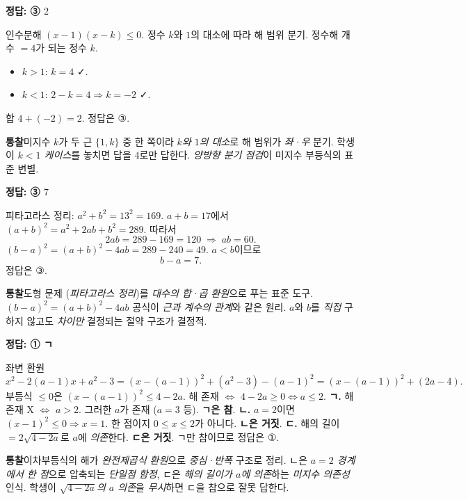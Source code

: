 \documentclass[10pt]{article}
\newcommand{\solnote}[1]{\par\smallskip\noindent
  \begin{tcolorbox}[enhanced, breakable, colback=vB-light, colframe=vB-light,
    boxrule=0pt, arc=3pt, left=10pt, right=10pt, top=4pt, bottom=4pt,
    fontupper=\sffamily\footnotesize\color{vB-ink}]
    \textbf{\color{vB-deep}통찰}\quad #1
  \end{tcolorbox}}
\begin{document}
\begin{answerbox}\sffamily\bfseries 정답: ③ $2$\end{answerbox}
 인수분해 $(x - 1)(x - k) \le 0$.
 정수 $k$와 $1$의 대소에 따라 해 범위 분기.
 정수해 개수 $= 4$가 되는 정수 $k$.
\begin{itemize}\setlength{\itemsep}{0pt}
\item $k > 1$: $k = 4$ ✓.
\item $k < 1$: $2 - k = 4 \Rightarrow k = -2$ ✓.
\end{itemize}
 합 $4 + (-2) = 2$.
정답은 $\textbf{③}$.
\solnote{미지수 $k$가 두 근 $\{1, k\}$ 중 한 쪽이라 \emph{$k$와 $1$의 대소}로 해 범위가 \emph{좌·우} 분기. 학생이 \emph{$k < 1$ 케이스}를 놓치면 답을 $4$로만 답한다. \emph{양방향 분기 점검}이 미지수 부등식의 표준 변별.}

\begin{answerbox}\sffamily\bfseries 정답: ③ $7$\end{answerbox}
 피타고라스 정리: $a^2 + b^2 = 13^2 = 169$.
 $a + b = 17$에서 $(a + b)^2 = a^2 + 2ab + b^2 = 289$. 따라서
\[ 2ab = 289 - 169 = 120 \;\Longrightarrow\; ab = 60. \]
 $(b - a)^2 = (a + b)^2 - 4ab = 289 - 240 = 49$. $a < b$이므로
\[ b - a = 7. \]
정답은 $\textbf{③}$.
\solnote{도형 문제 (\emph{피타고라스 정리})를 \emph{대수의 합·곱 환원}으로 푸는 표준 도구. $(b - a)^2 = (a+b)^2 - 4ab$ 공식이 \emph{근과 계수의 관계}와 같은 원리. $a$와 $b$를 \emph{직접} 구하지 않고도 \emph{차이만} 결정되는 절약 구조가 결정적.}

\begin{answerbox}\sffamily\bfseries 정답: ① ㄱ\end{answerbox}
 좌변 환원
\[ x^2 - 2(a - 1)x + a^2 - 3 = (x - (a - 1))^2 + (a^2 - 3) - (a - 1)^2 = (x - (a - 1))^2 + (2a - 4). \]
부등식 $\le 0$은 $(x - (a-1))^2 \le 4 - 2a$. 해 존재 $\Leftrightarrow$ $4 - 2a \ge 0 \Leftrightarrow a \le 2$.
 \textbf{ㄱ.} 해 존재 X $\Leftrightarrow$ $a > 2$. 그러한 $a$가 존재 ($a = 3$ 등). \textbf{ㄱ은 참}.
 \textbf{ㄴ.} $a = 2$이면 $(x - 1)^2 \le 0 \Rightarrow x = 1$. 한 점이지 $0 \le x \le 2$가 아니다. \textbf{ㄴ은 거짓}.
 \textbf{ㄷ.} 해의 길이 $= 2\sqrt{4 - 2a}$로 $a$에 \emph{의존}한다. \textbf{ㄷ은 거짓}.
 ㄱ만 참이므로 정답은 $\textbf{①}$.
\solnote{이차부등식의 해가 \emph{완전제곱식 환원}으로 \emph{중심·반폭} 구조로 정리. ㄴ은 \emph{$a = 2$ 경계에서 한 점}으로 압축되는 \emph{단일점 함정}, ㄷ은 \emph{해의 길이가 $a$에 의존}하는 \emph{미지수 의존성} 인식. 학생이 \emph{$\sqrt{4 - 2a}$의 $a$ 의존}을 \emph{무시}하면 ㄷ을 참으로 잘못 답한다.}
\end{document}
